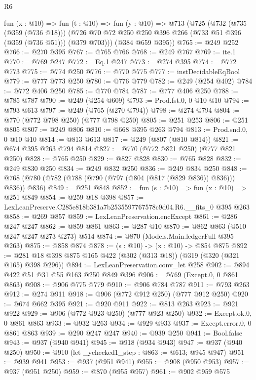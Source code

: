 \begin{lexlean}{R6}
\begin{coremodule}
  fun (x : @10) =>
  fun (t : @10) =>
  fun (y : @10) =>
  @713
    (@725
      (@732
        (@735 (@359 (@736 @18)))
        (@726 @70 @72 @250 @250 @396 @266 (@733 @51 @396 (@359 (@736 @51))) (@379 @703)))
      (@384 @659 @395))
@765 := @249 @252
@766 := @270 @395
@767 := @765 @766
@768 := @249 @767
@769 := ite.{1}
@770 := @769 @247
@772 := Eq.{1} @247
@773 := @274 @395
@774 := @772 @773
@775 := @774 @250
@776 := @770 @775
@777 := instDecidableEqBool
@779 := @777 @773 @250
@780 := @776 @779
@782 := @249 (@254 @402)
@784 := @772 @406 @250
@785 := @770 @784
@787 := @777 @406 @250
@788 := @785 @787
@790 := @249 (@254 @609)
@793 := Prod.fst.{0, 0} @10 @10
@794 := @793 @613
@797 := @249 (@765 (@270 @794))
@798 := @274 @794
@804 := @770 (@772 @798 @250) (@777 @798 @250)
@805 := @251 @253
@806 := @251 @805
@807 := @249 @806
@810 := @668 @395 @263 @794
@813 := Prod.snd.{0, 0} @10 @10
@814 := @813 @613
@817 := @249 (@807 (@810 @814))
@821 := @674 @395 @263 @794 @814
@827 := @770 (@772 @821 @250) (@777 @821 @250)
@828 := @765 @250
@829 := @827 @828
@830 := @765 @828
@832 := @249 @830 @250
@834 := @249 @832 @250
@836 := @249 @834 @250
@848 := @768 (@780 (@782 (@788 (@790 (@797 (@804 (@817 (@829 @836)) @836))) @836)) @836)
@849 := @251 @848
@852 := fun (s : @10) => fun (x : @10) => @251 @849
@854 := @259 @18 @398
@857 := LexLeanPreserve.C285e818b381a7b2535597767578c9d04.R6.__fits_0 @395 @263
@858 := @269 @857
@859 := LexLeanPreservation.encExcept
@861 := @286 @247 @247
@862 := @859 @861
@863 := @287 @10
@870 := @862 @863 (@510 @247 @247 @273 @273) @514
@874 := @870 (Models.Main.ledgerFull @395 @263)
@875 := @858 @874
@878 := (s : @10) -> (x : @10) -> @854 @875
@892 := @281 @18 @398 @875 @165 @422 (@302 (@313 @18)) (@319 (@320 (@321 @165) @398 @296))
@894 := LexLeanPreservation.conv_let @258
@902 := @894 @422 @51 @31 @55 @163 @250 @849 @396
@906 := @769 (Except.{0, 0} @861 @863)
@908 := @906 @775 @779
@910 := @906 @784 @787
@911 := @793 @263
@912 := @274 @911
@918 := @906 (@772 @912 @250) (@777 @912 @250)
@920 := @674 @662 @395
@921 := @920 @911
@922 := @813 @263
@923 := @921 @922
@929 := @906 (@772 @923 @250) (@777 @923 @250)
@932 := Except.ok.{0, 0} @861 @863
@933 := @932 @263
@934 := @929 @933
@937 := Except.error.{0, 0} @861 @863
@939 := @290 @247 @247
@940 := @939 @250
@941 := Bool.false
@943 := @937 (@940 @941)
@945 := @918 (@934 @943)
@947 := @937 (@940 @250)
@950 := @910 (let _ychecked1_step : @863 := @613; @945 @947)
@951 := @939 @941
@953 := @937 (@951 @941)
@955 := @908 (@950 @953)
@957 := @937 (@951 @250)
@959 := @870 (@955 @957)
@961 := @902 @959 @575

\end{coremodule}
\end{lexlean}
